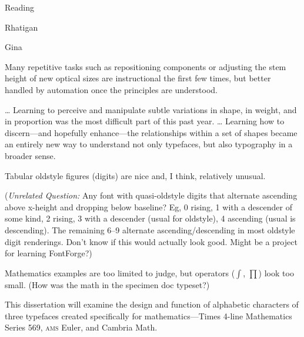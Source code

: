 \documentclass[11pt]{PalisadesLakesBook}
\begin{document}
\begin{plSection}{Reading}
\begin{plSection}{Rhatigan}
\begin{plSection}{Gina}
\begin{plSection}{}
\begin{plQuote}{}{}
Many repetitive tasks such as repositioning components or
adjusting the stem height of new optical sizes are instructional 
the first few times,
but better handled by automation 
once the principles are understood.

{\ldots}
Learning to perceive and manipulate subtle variations in shape,
in weight, and in proportion was the most difficult part 
of this past year.
{\ldots} Learning how to discern---and hopefully enhance---the
relationships within a set of shapes became
an entirely new way to understand not only typefaces,
but also typography in a broader sense.
\end{plQuote}

\end{plSection}%
\begin{plSection}{}

Tabular oldstyle figures (digits) are nice and, I think,
relatively unusual.

(\emph{Unrelated Question:} 
Any font with quasi-oldstyle digits that alternate 
ascending above x-height and dropping below baseline?
Eg, 0 rising, 1 with a descender of some kind, 2 rising, 3 with
a descender (usual for oldstyle), 4 ascending (usual is descending).
The remaining 6--9 alternate ascending/descending in most
oldstyle digit renderings.
Don't know if this would actually look good.
Might be a project for learning FontForge?)

Mathematics examples are too limited to judge, 
but operators ($\int$, $\prod$) look too small. 
(How was the math in the specimen doc typeset?)

\end{plSection}%
\end{plSection}%
\begin{plSection}{}


\begin{plQuote}{}{}
This dissertation will examine the design and function of
alphabetic characters of three typefaces created specifically for
mathematics---Times 4-line Mathematics Series 569,
\textsc{ams} Euler, and Cambria Math.


\end{plQuote}
\end{plSection}
\end{plSection}
\end{plSection}
\end{document}

